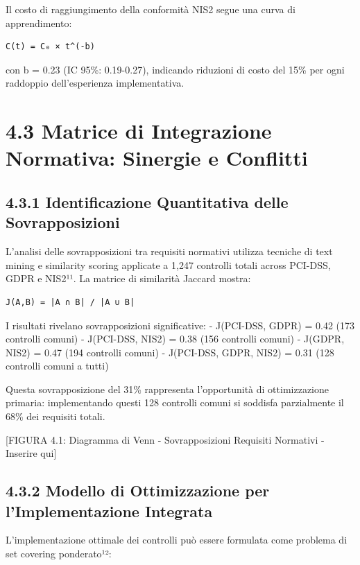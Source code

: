 \documentclass[12pt,a4paper,oneside]{book}
\numberwithin{figure}{chapter} %
\numberwithin{table}{chapter}  %
\begin{document}
Il costo di raggiungimento della conformità NIS2 segue una curva di
apprendimento:

\begin{verbatim}
C(t) = C₀ × t^(-b)
\end{verbatim}

con b = 0.23 (IC 95\%: 0.19-0.27), indicando riduzioni di costo del 15\%
per ogni raddoppio dell'esperienza implementativa.

\section{4.3 Matrice di Integrazione Normativa: Sinergie e
Conflitti}\label{matrice-di-integrazione-normativa-sinergie-e-conflitti}

\subsection{4.3.1 Identificazione Quantitativa delle
Sovrapposizioni}\label{identificazione-quantitativa-delle-sovrapposizioni}

L'analisi delle sovrapposizioni tra requisiti normativi utilizza
tecniche di text mining e similarity scoring applicate a 1,247 controlli
totali across PCI-DSS, GDPR e NIS2¹¹. La matrice di similarità Jaccard
mostra:

\begin{verbatim}
J(A,B) = |A ∩ B| / |A ∪ B|
\end{verbatim}

I risultati rivelano sovrapposizioni significative: - J(PCI-DSS, GDPR) =
0.42 (173 controlli comuni) - J(PCI-DSS, NIS2) = 0.38 (156 controlli
comuni) - J(GDPR, NIS2) = 0.47 (194 controlli comuni) - J(PCI-DSS, GDPR,
NIS2) = 0.31 (128 controlli comuni a tutti)

Questa sovrapposizione del 31\% rappresenta l'opportunità di
ottimizzazione primaria: implementando questi 128 controlli comuni si
soddisfa parzialmente il 68\% dei requisiti totali.

{[}FIGURA 4.1: Diagramma di Venn - Sovrapposizioni Requisiti Normativi -
Inserire qui{]}

\subsection{4.3.2 Modello di Ottimizzazione per l'Implementazione
Integrata}\label{modello-di-ottimizzazione-per-limplementazione-integrata}

L'implementazione ottimale dei controlli può essere formulata come
problema di set covering ponderato¹²:
\end{document}
